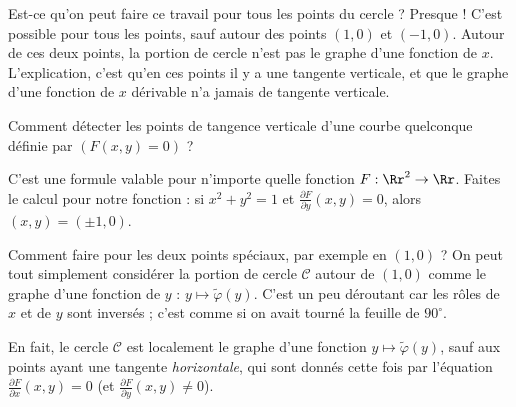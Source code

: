 \documentclass[11pt, class=report,crop=false]{standalone}
\begin{document}


\bigskip

Est-ce qu'on peut faire ce travail pour tous les points du cercle ? 
Presque ! C'est possible pour tous les points, sauf autour des points $(1,0)$ et $(-1,0)$. Autour de ces deux points, la portion de cercle n'est pas le graphe d'une fonction de $x$. L'explication, c'est qu'en ces points il y a une tangente verticale, et que le graphe d'une fonction de $x$ dérivable n'a jamais de tangente verticale.



\bigskip

Comment détecter les points de tangence verticale d'une courbe quelconque définie par $(F(x,y)=0)$ ?



C'est une formule valable pour n'importe quelle fonction $F :\Rr^2 \to \Rr$.
Faites le calcul pour notre fonction : si $x^2+y^2=1$ et $\frac{\partial F}{\partial y}(x,y)=0$, alors $(x,y)=(\pm1,0)$.

\bigskip

Comment faire pour les deux points spéciaux, par exemple en $(1,0)$ ? On peut tout simplement considérer la portion de cercle $\mathcal{C}$ autour de $(1,0)$ comme le graphe d'une fonction de $y$ : $y \mapsto \tilde\varphi(y)$. C'est un peu déroutant car les rôles de $x$ et de $y$ sont inversés ; c'est comme si on avait tourné la feuille de $90^\circ$.

\begin{center} 
    \begin{minipage}{0.3\textwidth}      
    \end{minipage}\qquad\qquad
    \begin{minipage}{0.55\textwidth}  
    \end{minipage}  
\end{center}


En fait, le cercle $\mathcal{C}$ est localement le graphe d'une fonction $y \mapsto \tilde\varphi(y)$, sauf aux points ayant une tangente \emph{horizontale}, qui sont donnés cette fois par l'équation $\frac{\partial F}{\partial x}(x,y)=0$ (et $\frac{\partial F}{\partial y}(x,y)\neq0$).
\end{document}
